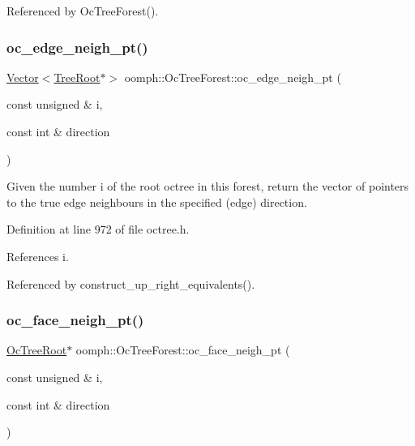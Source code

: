Referenced by Oc\+Tree\+Forest().

\mbox{\label{classoomph_1_1OcTreeForest_a503eb3fe79030997e6e46da15b69b316}} 
\subsubsection{\texorpdfstring{oc\+\_\+edge\+\_\+neigh\+\_\+pt()}{oc\_edge\_neigh\_pt()}}
{\footnotesize\ttfamily \hyperlink{classoomph_1_1Vector}{Vector}$<$\hyperlink{classoomph_1_1TreeRoot}{Tree\+Root}$\ast$$>$ oomph\+::\+Oc\+Tree\+Forest\+::oc\+\_\+edge\+\_\+neigh\+\_\+pt (\begin{DoxyParamCaption}\item[{const unsigned \&}]{i,  }\item[{const int \&}]{direction }\end{DoxyParamCaption})\hspace{0.3cm}{\ttfamily [inline]}}



Given the number i of the root octree in this forest, return the vector of pointers to the true edge neighbours in the specified (edge) direction. 



Definition at line 972 of file octree.\+h.



References i.



Referenced by construct\+\_\+up\+\_\+right\+\_\+equivalents().

\mbox{\label{classoomph_1_1OcTreeForest_a796fe9ebeefb043d7b6d5ddacd9e234c}} 
\subsubsection{\texorpdfstring{oc\+\_\+face\+\_\+neigh\+\_\+pt()}{oc\_face\_neigh\_pt()}}
{\footnotesize\ttfamily \hyperlink{classoomph_1_1OcTreeRoot}{Oc\+Tree\+Root}$\ast$ oomph\+::\+Oc\+Tree\+Forest\+::oc\+\_\+face\+\_\+neigh\+\_\+pt (\begin{DoxyParamCaption}\item[{const unsigned \&}]{i,  }\item[{const int \&}]{direction }\end{DoxyParamCaption})\hspace{0.3cm}{\ttfamily [inline]}}



